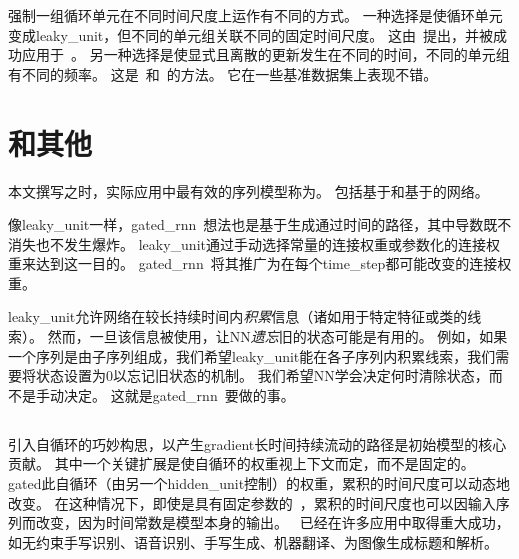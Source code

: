 
强制一组循环单元在不同时间尺度上运作有不同的方式。
一种选择是使循环单元变成\gls{leaky_unit}，但不同的单元组关联不同的固定时间尺度。
这由~\cite{Mozer-nips92}提出，并被成功应用于~\cite{Pascanu+al-ICML2013-small}。
另一种选择是使显式且离散的更新发生在不同的时间，不同的单元组有不同的频率。
这是~\cite{ElHihi+Bengio-nips8}和~\cite{Koutnik-et-al-ICML2014}的方法。
它在一些基准数据集上表现不错。

\section{和其他}
\label{sec:the_long_short_term_memory_and_other_gated_rnns}
本文撰写之时，实际应用中最有效的序列模型称为。
包括基于和基于的网络。

像\gls{leaky_unit}一样，\gls{gated_rnn}~想法也是基于生成通过时间的路径，其中导数既不消失也不发生爆炸。
\gls{leaky_unit}通过手动选择常量的连接权重或参数化的连接权重来达到这一目的。
\gls{gated_rnn}~将其推广为在每个\gls{time_step}都可能改变的连接权重。

\gls{leaky_unit}允许网络在较长持续时间内\emph{积累}信息（诸如用于特定特征或类的线索）。
然而，一旦该信息被使用，让\gls{NN}\emph{遗忘}旧的状态可能是有用的。
例如，如果一个序列是由子序列组成，我们希望\gls{leaky_unit}能在各子序列内积累线索，我们需要将状态设置为0以忘记旧状态的机制。
我们希望\gls{NN}学会决定何时清除状态，而不是手动决定。
这就是\gls{gated_rnn}~要做的事。

\subsection{}
\label{sec:lstm}
引入自循环的巧妙构思，以产生\gls{gradient}长时间持续流动的路径是初始模型的核心贡献\citep{Hochreiter+Schmidhuber-1997}。
其中一个关键扩展是使自循环的权重视上下文而定，而不是固定的\citep{Gers-et-al-2000}。
\gls{gated}此自循环（由另一个\gls{hidden_unit}控制）的权重，累积的时间尺度可以动态地改变。
在这种情况下，即使是具有固定参数的~，累积的时间尺度也可以因输入序列而改变，因为时间常数是模型本身的输出。
~已经在许多应用中取得重大成功，如无约束手写识别\citep{Graves-et-al-2009}、语音识别\citep{Graves-et-al-ICASSP2013,Graves+Jaitly-ICML2014}、手写生成\citep{Graves-arxiv2013}、机器翻译\citep{Sutskever-et-al-NIPS2014}、为图像生成标题\citep{Kiros-et-al-arxiv2014,Vinyals-et-al-arxiv2014,Xu-et-al-ICML2015}和解析\citep{Vinyals2014}。


